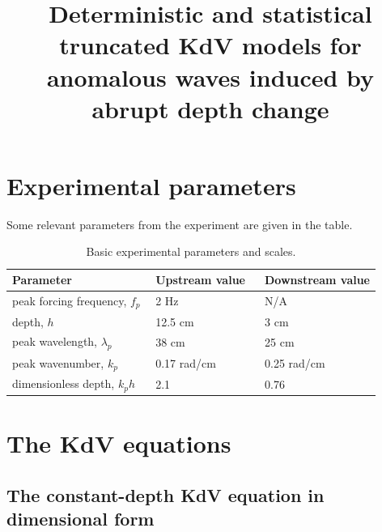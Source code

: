 \documentclass[12pt]{article}
\begin{document}
\title{Deterministic and statistical truncated KdV models for anomalous waves induced by abrupt depth change}
\author{}
\maketitle


\section{Experimental parameters}

Some relevant parameters from the experiment are given in the table.

\begin{table}%
\begin{center}
\caption{Basic experimental parameters and scales.}
\label{exptable}
\begin{tabular}{l l l}
\hline Parameter & Upstream  value \,\, & Downstream value \\
\hline
peak forcing frequency, $f_p$\,\,		& 2 Hz			& N/A \\
depth, $h$						& 12.5 cm			& 3 cm \\
peak wavelength, $\lambda_p$		& 38 cm			& 25 cm \\
peak wavenumber, $k_p$			& 0.17 rad/cm		& 0.25 rad/cm \\
dimensionless depth, $k_p h$\,\,\,		& 2.1			& 0.76 \\
\end{tabular}
\end{center}
\end{table}
 
\section{The KdV equations}

\subsection{The constant-depth KdV equation in dimensional form}
\end{document}
